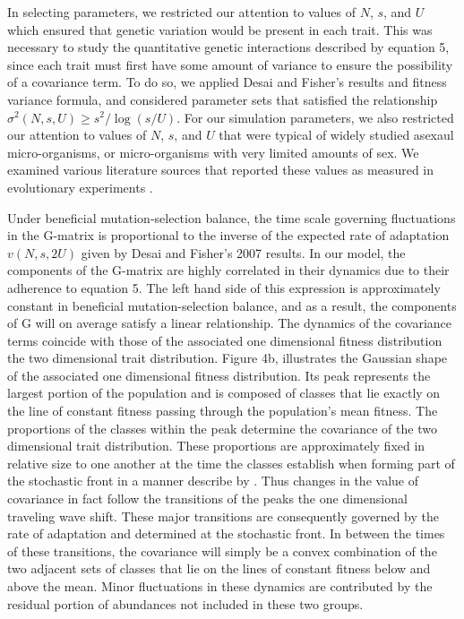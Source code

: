 \documentclass[11pt,twocolumn]{article}
\begin{document}
In selecting parameters, we restricted our attention to values of $N$, $s$, and $U$ which ensured that genetic variation would be present in each trait. This was necessary to study the quantitative genetic interactions described  by equation 5, since each trait must first have some amount of variance to ensure the possibility of a covariance term.  To do so, we applied Desai and Fisher's results and fitness variance formula, and considered parameter sets that satisfied the relationship $\sigma^2(N,s,U) \geq s^2 / \log(s/U)$. For our simulation parameters, we also restricted our attention to values of $N$, $s$, and $U$ that were typical of widely studied asexaul micro-organisms, or micro-organisms with very limited amounts of sex. We examined various literature sources that reported these values as measured in evolutionary experiments \citep{Perfeito2007,desai2007speed,Levy2015}. 

Under beneficial mutation-selection balance, the time scale governing fluctuations in the G-matrix is proportional to the inverse of the expected rate of adaptation $v(N,s,2U)$ given by Desai and Fisher's 2007 results. In our model, the components of the G-matrix are highly correlated in their dynamics due to their adherence to equation 5. The left hand side of this expression is approximately constant in beneficial mutation-selection balance, and as a result, the components of G will on average satisfy a linear relationship. The dynamics of the covariance terms coincide with those of the associated one dimensional fitness distribution the two dimensional trait distribution. Figure 4b, illustrates the Gaussian shape of the associated one dimensional fitness distribution.  Its peak represents the largest portion of the population and is composed of classes that lie exactly on the line of constant fitness passing through the population's mean fitness. The proportions of the classes within the peak determine the covariance of the two dimensional trait distribution. These proportions are approximately fixed in relative size to one another at the time the classes establish when forming part of the stochastic front in a manner describe by \cite{Desai2013}. Thus changes in the value of covariance in fact follow the transitions of the peaks the one dimensional traveling wave shift. These major transitions are consequently governed by the rate of adaptation and determined at the stochastic front.  In between the times of these transitions, the covariance will simply be a convex combination of the two adjacent sets of classes that lie on the lines of constant fitness below and above the mean. Minor fluctuations in these dynamics are contributed by the residual portion of abundances not included in these two groups. 
\end{document}
